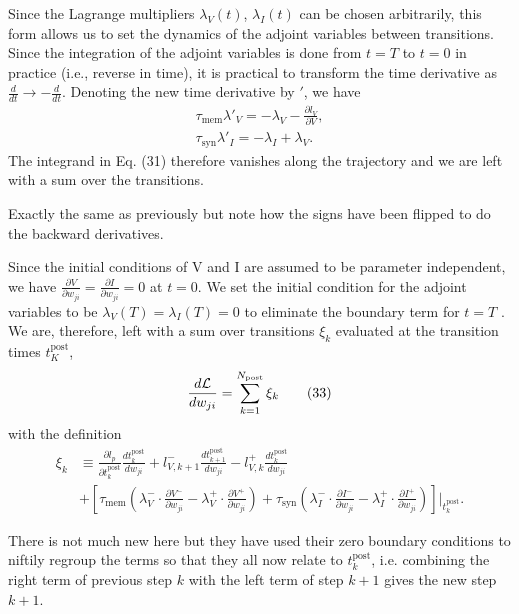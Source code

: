 \documentclass[a4paper]{article}
\newcommand{\blue}[1]{{\color{blue}#1}}
\begin{document}
\blue{
  Since the Lagrange multipliers $\lambda_V(t)$, $\lambda_I(t)$ can be
  chosen arbitrarily, this form allows us to set the dynamics of 
the adjoint variables between transitions. Since the integration of the adjoint variables is done from $t = T$ to
$t = 0$ in practice (i.e., reverse in time), it is practical to
transform the time derivative as $\frac{d}{dt} \rightarrow
-\frac{d}{dt}$. Denoting the new time derivative by $'$, we have
\begin{align}
  \tau_{\text{mem}} \lambda'_V = -\lambda_V - \frac{\partial
    l_V}{\partial V}, \tag{32a} \\
  \tau_{\text{syn}} \lambda'_I = -\lambda_I + \lambda_V. \tag{32b}
\end{align}
The integrand in Eq. (31) therefore vanishes along the trajectory and
we are left with a sum over the transitions.
}

Exactly the same as previously but note how the signs have been
flipped to do the backward derivatives.

\blue{
  Since the initial conditions of V and I are assumed to be parameter
  independent, we have $\frac{\partial V}{\partial w_{ji}} =
  \frac{\partial I}{\partial w_{ji}} = 0$ at $t= 0$. We set the
  initial condition for the adjoint variables to be $\lambda_V(T) =
  \lambda_I(T) = 0$ to eliminate the boundary term for $t = T$ . We
  are, therefore, left with a sum over transitions $\xi_k$ evaluated
  at the transition times $t_K^{\text{post}}$,
  \begin{align}
    \frac{d \cal L}{d w_{ji}} = \sum_{k=1}^{N_{\text{post}}} \xi_k \tag{33}
  \end{align}
  with the definition
  \begin{align}
    \xi_k &\equiv \frac{\partial l_p}{\partial t_k^{\text{post}}} \frac{d
      t_k^{\text{post}}}{d w_{ji}}
    + l^-_{V,k+1}
      \frac{dt_{k+1}^{\text{post}}}{d w_{ji}} - l^+_{V,k} \frac{d
        t_k^{\text{post}}}{d w_{ji}} \nonumber \\
      &+ \left[\tau_{\text{mem}} \left( \lambda^-_V \cdot
        \frac{\partial V^-}{\partial w_{ji}} - \lambda_V^+ \cdot
        \frac{\partial V^+}{\partial w_{ji}} \right)
      + \tau_{\text{syn}} \left(\lambda^-_I \cdot \frac{\partial
        I^-}{\partial w_{ji}} - \lambda_I^+ \cdot \frac{\partial
        I^+}{\partial w_{ji}} \right)
      \right]\bigg|_{t_k^{\text{post}}} . \tag{34}
  \end{align}
}

  There is not much new here but they have used their zero boundary
  conditions to niftily regroup the terms so that they all now relate
  to $t_k^{\text{post}}$, i.e. combining the right term of previous
  step $k$ with the left term of step $k+1$ gives the new step $k+1$.
\end{document}
